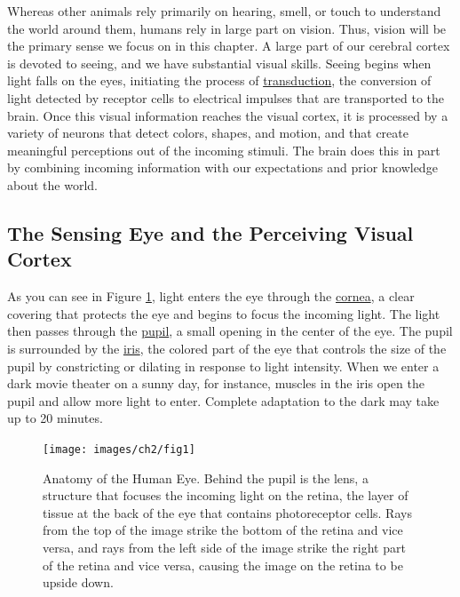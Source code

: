 \documentclass[
]{krantz}
\begin{document}
Whereas other animals rely primarily on hearing, smell, or touch to understand the world around them, humans rely in large part on vision. Thus, vision will be the primary sense we focus on in this chapter. A large part of our cerebral cortex is devoted to seeing, and we have substantial visual skills. Seeing begins when light falls on the eyes, initiating the process of \hyperref[transduction]{transduction}, the conversion of light detected by receptor cells to electrical impulses that are transported to the brain. Once this visual information reaches the visual cortex, it is processed by a variety of neurons that detect colors, shapes, and motion, and that create meaningful perceptions out of the incoming stimuli. The brain does this in part by combining incoming information with our expectations and prior knowledge about the world.

\subsection*{The Sensing Eye and the Perceiving Visual Cortex}\label{the-sensing-eye-and-the-perceiving-visual-cortex}


As you can see in Figure \ref{fig:anatomy}, light enters the eye through the \hyperref[cornea]{cornea}, a clear covering that protects the eye and begins to focus the incoming light. The light then passes through the \hyperref[pupil]{pupil}, a small opening in the center of the eye. The pupil is surrounded by the \hyperref[iris]{iris}, the colored part of the eye that controls the size of the pupil by constricting or dilating in response to light intensity. When we enter a dark movie theater on a sunny day, for instance, muscles in the iris open the pupil and allow more light to enter. Complete adaptation to the dark may take up to 20 minutes.

\begin{figure}

{\centering \texttt{[image: images/ch2/fig1]} 

}

\caption{Anatomy of the Human Eye. Behind the pupil is the lens, a structure that focuses the incoming light on the retina, the layer of tissue at the back of the eye that contains photoreceptor cells. Rays from the top of the image strike the bottom of the retina and vice versa, and rays from the left side of the image strike the right part of the retina and vice versa, causing the image on the retina to be upside down.}\label{fig:anatomy}
\end{figure}
\end{document}
